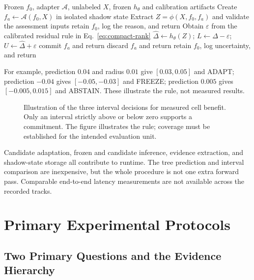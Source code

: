 \begin{algorithm}[t]
\caption{KGA for one proposed update}
\label{alg:compact-kga}
\begin{algorithmic}[1]
\Require Frozen $f_0$, adapter $\mathcal A$, unlabeled $X$, frozen $h_\theta$ and calibration artifacts
\State Create $f_a\leftarrow\mathcal A(f_0,X)$ in isolated shadow state
\State Extract $Z=\phi(X,f_0,f_a)$ and validate the assessment inputs
  \State retain $f_0$, log the reason, and return \abstain
\EndIf
\State Obtain $\varepsilon$ from the calibrated residual rule in Eq.~\eqref{eq:compact-rank}
\State $\widehat\Delta\leftarrow h_\theta(Z)$; $L\leftarrow\widehat\Delta-\varepsilon$; $U\leftarrow\widehat\Delta+\varepsilon$
 \State commit $f_a$ and return \adapt
{} \State discard $f_a$ and return \freeze
\Else \State retain $f_0$, log uncertainty, and return \abstain
\EndIf
\end{algorithmic}
\end{algorithm}

For example, prediction $0.04$ and radius $0.01$ give $[0.03,0.05]$ and ADAPT; prediction
$-0.04$ gives $[-0.05,-0.03]$ and FREEZE; prediction $0.005$ gives $[-0.005,0.015]$ and ABSTAIN.
These illustrate the rule, not measured results.

\begin{figure}[t]
\centering
{}
\caption{Illustration of the three interval decisions for measured cell benefit. Only an interval
strictly above or below zero supports a commitment. The figure illustrates the rule; coverage
must be established for the intended evaluation unit.}
\label{fig:compact-certificate}
\end{figure}

Candidate adaptation, frozen and candidate inference, evidence extraction, and shadow-state storage
all contribute to runtime. The tree prediction and interval comparison are inexpensive, but the
whole procedure is not one extra forward pass. Comparable end-to-end latency measurements are
not available across the recorded tracks.

\section{Primary Experimental Protocols}
\label{sec:compact-experiments}

\subsection{Two Primary Questions and the Evidence Hierarchy}

